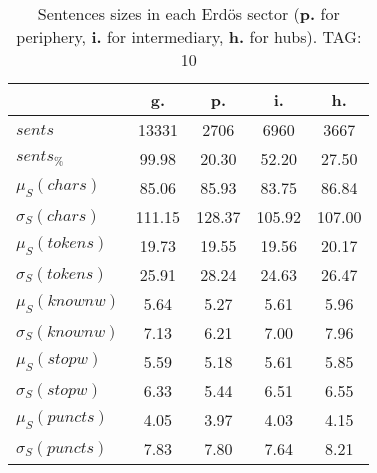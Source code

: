 \begin{table}[h!]
\begin{center}
\begin{tabular}{| l | c | c | c | c |}\hline
 & g. & p. & i. & h. \\\hline
$sents$ & 13331  & 2706  & 6960  & 3667 \\\hline
$sents_{\%}$ & 99.98  & 20.30  & 52.20  & 27.50 \\\hline
$\mu_S(chars)$ & 85.06  & 85.93  & 83.75  & 86.84 \\\hline
$\sigma_S(chars)$ & 111.15  & 128.37  & 105.92  & 107.00 \\\hline
$\mu_S(tokens)$ & 19.73  & 19.55  & 19.56  & 20.17 \\\hline
$\sigma_S(tokens)$ & 25.91  & 28.24  & 24.63  & 26.47 \\\hline
$\mu_S(knownw)$ & 5.64  & 5.27  & 5.61  & 5.96 \\\hline
$\sigma_S(knownw)$ & 7.13  & 6.21  & 7.00  & 7.96 \\\hline
$\mu_S(stopw)$ & 5.59  & 5.18  & 5.61  & 5.85 \\\hline
$\sigma_S(stopw)$ & 6.33  & 5.44  & 6.51  & 6.55 \\\hline
$\mu_S(puncts)$ & 4.05  & 3.97  & 4.03  & 4.15 \\\hline
$\sigma_S(puncts)$ & 7.83  & 7.80  & 7.64  & 8.21 \\\hline
\end{tabular}
\caption{Sentences sizes in each Erd\"os sector ({{\bf p.}} for periphery, {{\bf i.}} for intermediary, {{\bf h.}} for hubs). TAG: 10}
\end{center}
\end{table}